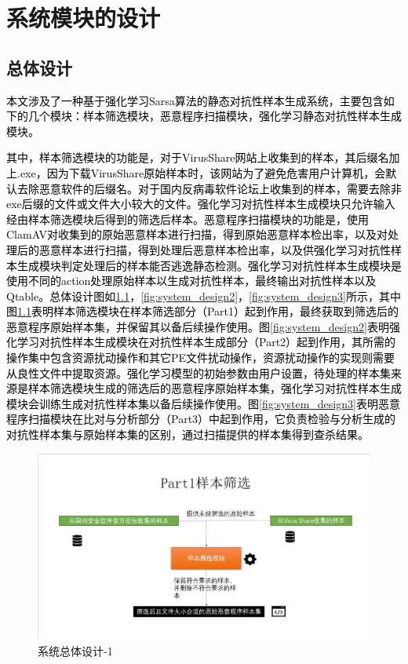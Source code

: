 
\chapter{系统模块的设计}

\section{总体设计}

\textcolor{black}{本文涉及了一种基于强化学习Sarsa算法的静态对抗性样本生成系统，主要包含如下的几个模块：样本筛选模块，恶意程序扫描模块，强化学习静态对抗性样本生成模块。}

\textcolor{black}{其中，样本筛选模块的功能是，对于VirusShare网站上收集到的样本，其后缀名加上.exe，因为下载VirusShare原始样本时，该网站为了避免危害用户计算机，会默认去除恶意软件的后缀名。对于国内反病毒软件论坛上收集到的样本，需要去除非exe后缀的文件或文件大小较大的文件。强化学习对抗性样本生成模块只允许输入经由样本筛选模块后得到的筛选后样本。恶意程序扫描模块的功能是，使用ClamAV对收集到的原始恶意样本进行扫描，得到原始恶意样本检出率，以及对处理后的恶意样本进行扫描，得到处理后恶意样本检出率，以及供强化学习对抗性样本生成模块判定处理后的样本能否逃逸静态检测。强化学习对抗性样本生成模块是使用不同的action处理原始样本以生成对抗性样本，最终输出对抗性样本以及Qtable。总体设计图如\ref{fig:system_design1}，\ref{fig:system_design2}，\ref{fig:system_design3}所示，其中图\ref{fig:system_design1}表明样本筛选模块在样本筛选部分（Part1）起到作用，最终获取到筛选后的恶意程序原始样本集，并保留其以备后续操作使用。图\ref{fig:system_design2}表明强化学习对抗性样本生成模块在对抗性样本生成部分（Part2）起到作用，其所需的操作集中包含资源扰动操作和其它PE文件扰动操作，资源扰动操作的实现则需要从良性文件中提取资源。强化学习模型的初始参数由用户设置，待处理的样本集来源是样本筛选模块生成的筛选后的恶意程序原始样本集，强化学习对抗性样本生成模块会训练生成对抗性样本集以备后续操作使用。图\ref{fig:system_design3}表明恶意程序扫描模块在比对与分析部分（Part3）中起到作用，它负责检验与分析生成的对抗性样本集与原始样本集的区别，通过扫描提供的样本集得到查杀结果。}

\begin{figure}
  \centering
  \includegraphics[]{images/system_design1.png}
  \caption{系统总体设计-1}\label{fig:system_design1}
\end{figure}

